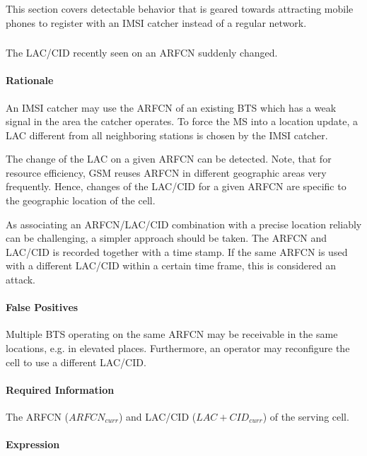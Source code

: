 \documentclass[a4paper,11pt,notitlepage,bigheadings,oneside]{scrartcl}
\begin{document}
This section covers detectable behavior that is geared towards attracting
mobile phones to register with an IMSI catcher instead of a regular network.

\subsubsection{}

The LAC/CID recently seen on an ARFCN suddenly changed.

\paragraph{Rationale}

An IMSI catcher may use the ARFCN of an existing BTS which has a weak signal in
the area the catcher operates. To force the MS into a location update, a LAC
different from all neighboring stations is chosen by the IMSI catcher.

The change of the LAC on a given ARFCN can be detected. Note, that for resource
efficiency, GSM reuses ARFCN in different geographic areas very frequently.
Hence, changes of the LAC/CID for a given ARFCN are specific to the geographic
location of the cell.

As associating an ARFCN/LAC/CID combination with a precise location reliably
can be challenging, a simpler approach should be taken. The ARFCN and LAC/CID
is recorded together with a time stamp. If the same ARFCN is used with a
different LAC/CID within a certain time frame, this is considered an attack.

\paragraph{False Positives}

Multiple BTS operating on the same ARFCN may be receivable in the same
locations, e.g. in elevated places. Furthermore, an operator may reconfigure
the cell to use a different LAC/CID.

\paragraph{Required Information}

The ARFCN ($ARFCN_{curr}$) and LAC/CID ($LAC+CID_{curr}$) of the serving cell.

\paragraph{Expression}
\end{document}
